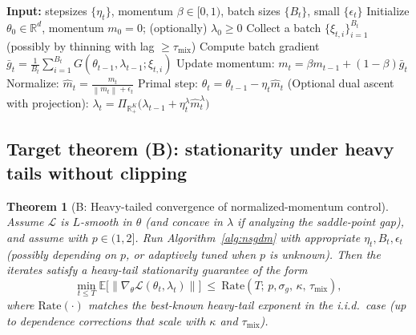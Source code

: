 \documentclass[11pt]{article}
\newcommand{\E}{\mathbb{E}}
\newcommand{\1}{\mathbf{1}}
\newcommand{\R}{\mathbb{R}}
\newcommand{\norm}[1]{\left\|#1\right\|}
\theoremstyle{plain}
\newtheorem{theorem}{Theorem}[section]
\theoremstyle{definition}
\theoremstyle{remark}
\begin{document}
\begin{algorithm}[t]
\caption{Batched NSGDM controller (template)}
\label{alg:nsgdm}
\begin{algorithmic}[1]
\State \textbf{Input:} stepsizes $\{\eta_t\}$, momentum $\beta\in[0,1)$, batch sizes $\{B_t\}$, small $\{\epsilon_t\}$
\State Initialize $\theta_0\in\R^d$, momentum $m_0=0$; (optionally) $\lambda_0\ge 0$
  \State Collect a batch $\{\xi_{t,i}\}_{i=1}^{B_t}$ (possibly by thinning with lag $\ge\tau_{\mathrm{mix}}$)
  \State Compute batch gradient $\bar g_t = \frac{1}{B_t}\sum_{i=1}^{B_t} G(\theta_{t-1},\lambda_{t-1};\xi_{t,i})$
  \State Update momentum: $m_t = \beta m_{t-1} + (1-\beta)\bar g_t$
  \State Normalize: $\hat m_t = \frac{m_t}{\norm{m_t}+\epsilon_t}$
  \State Primal step: $\theta_t = \theta_{t-1} - \eta_t \hat m_t$
  \State (Optional dual ascent with projection): $\lambda_t = \Pi_{\R_+^K}\bigl(\lambda_{t-1} + \eta_t^\lambda \hat m_t^\lambda\bigr)$
\EndFor
\end{algorithmic}
\end{algorithm}

\subsection{Target theorem (B): stationarity under heavy tails without clipping}
\begin{theorem}[B: Heavy-tailed convergence of normalized-momentum control]\label{thm:B}
Assume $\mathcal{L}$ is $L$-smooth in $\theta$ (and concave in $\lambda$ if analyzing the saddle-point gap),
and assume  with $p\in(1,2]$.
Run Algorithm~\ref{alg:nsgdm} with appropriate $\eta_t,B_t,\epsilon_t$ (possibly depending on $p$,
or adaptively tuned when $p$ is unknown).
Then the iterates satisfy a heavy-tail stationarity guarantee of the form
\[
\min_{t\le T}\E\bigl[\norm{\nabla_\theta \mathcal{L}(\theta_t,\lambda_t)}\bigr]
\ \le\ 
\mathrm{Rate}\!\left(T;\,p,\sigma_g,\,\kappa,\,\tau_{\mathrm{mix}}\right),
\]
where $\mathrm{Rate}(\cdot)$ matches the best-known heavy-tail exponent in the i.i.d.\ case
(up to dependence corrections that scale with $\kappa$ and $\tau_{\mathrm{mix}}$).
\end{theorem}
\end{document}

